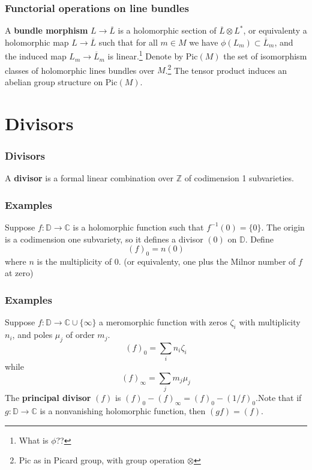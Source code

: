 \documentclass{beamer}
\begin{document}
\begin{frame}
\frametitle{Functorial operations on line bundles}

A \textbf{bundle morphism} $L \to \overline{L}$ is a holomorphic section of $\overline{L}\otimes L^*$, or equivalenty a holomorphic map $L\to \overline{L}$ such that for all $m \in M$ we have $\phi(L_m) \subset \overline{L}_m$, and the induced map $L_m \to \overline{L}_m$ is linear.\footnote{What is $\phi$??} \newline Denote by Pic$(M)$ the set of isomorphism classes of holomorphic lines bundles over $M$.\footnote{Pic as in Picard group, with group operation $\otimes$} \newline The tensor product induces an abelian group structure on Pic$(M)$.

\end{frame}

\section{Divisors}

\begin{frame}
\frametitle{Divisors}

A \textbf{divisor} is a formal linear combination over $\mathbb{Z}$ of codimension 1 subvarieties.

\end{frame}


\begin{frame}
\frametitle{Examples}

Suppose $f: \mathbb{D} \to \mathbb{C}$ is a holomorphic function such that $f^{-1}(0) = \{0\}$. The origin is a codimension one subvariety, so it defines a divisor $(0)$ on $\mathbb{D}$. Define \[(f)_0 = n(0)\] where $n$ is the multiplicity of $0$. (or equivalenty, one plus the Milnor number of $f$ at zero)

\end{frame}

\begin{frame}
\frametitle{Examples}

Suppose $f: \mathbb{D}\to \mathbb{C} \cup \{\infty\}$ a meromorphic function with zeros $\zeta_i$ with multiplicity $n_i$, and poles $\mu_j$ of order $m_j$. \[(f)_0 = \sum_i n_i\zeta_i\] while \[(f)_\infty = \sum_j m_j\mu_j\] The \textbf{principal divisor} $(f)$ is $(f)_0 - (f)_\infty = (f)_0 - (1/f)_0$.\newline Note that if $g:\mathbb{D}\to \mathbb{C}$ is a nonvanishing holomorphic function, then $(gf) = (f)$.

\end{frame}
\end{document}

